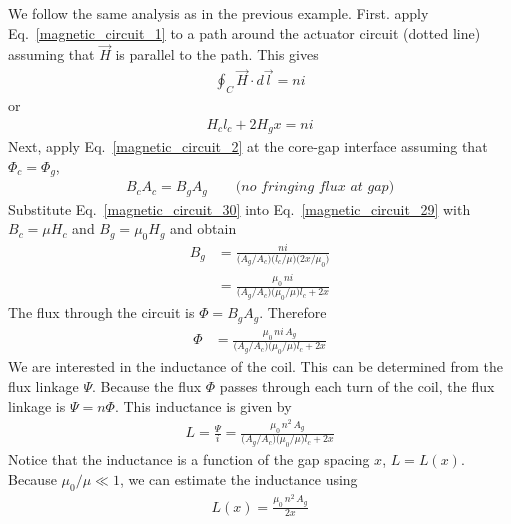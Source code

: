 \documentclass[12pt,a4paper,oneside]{book}
\begin{document}
\begin{onehalfspace}
\begin{example}
	We follow the same analysis as in the previous example.  First. apply Eq.~\eqref{magnetic_circuit_1} to a path around the actuator circuit (dotted line) assuming that $\vec{H}$ is parallel to the path. This gives
	\begin{equation*}\label{}
	{\begin{aligned}
			\oint_{C}\vec{H}\cdot d\vec{l}=ni
	\end{aligned}}
	\end{equation*}
or
	\begin{equation}\label{magnetic_circuit_29}
		{\begin{aligned}
			H_cl_c+2H_gx=ni
		\end{aligned}}
	\end{equation}
Next, apply Eq.~\eqref{magnetic_circuit_2} at the core-gap interface assuming that $\Phi_c=\Phi_g$,
	\begin{equation}\label{magnetic_circuit_30}
	{\begin{aligned}
			B_cA_c=B_gA_g\qquad\textit{(no fringing flux at gap)}
	\end{aligned}}
	\end{equation}
Substitute Eq.~\eqref{magnetic_circuit_30} into Eq.~\eqref{magnetic_circuit_29} with $B_c=\mu H_c$ and $B_g=\mu_0 H_g$ and obtain
\begin{equation*}\label{}
{\begin{aligned}
		B_g &=\frac{ni}{\Big(A_g/A_c\Big)\Big(l_c/\mu\Big)\Big(2x/\mu_0\Big)} \\[6pt]
		&=\frac{\mu_0\,ni}{\Big(A_g/A_c\Big)\Big(\mu_0/\mu\Big)l_c+2x}
\end{aligned}}
\end{equation*}
The flux through the circuit is $\Phi=B_g A_g$. Therefore
\begin{equation*}\label{}
	{\begin{aligned}
			\Phi &=\frac{\mu_0\,ni\,A_g}{\Big(A_g/A_c\Big)\Big(\mu_0/\mu\Big)l_c+2x}
	\end{aligned}}
\end{equation*}
We are interested in the inductance of the coil. This can be determined from the flux linkage $\Psi$. Because the flux $\Phi$ passes through each turn of the coil, the flux linkage is $\Psi=n\Phi$. This inductance is given by
\begin{equation*}\label{}
	{\begin{aligned}
			L=\frac{\Psi}{i}=\frac{\mu_0\,n^2\,A_g}{\Big(A_g/A_c\Big)\Big(\mu_0/\mu\Big)l_c+2x}
	\end{aligned}}
\end{equation*}
Notice that the inductance is a function of the gap spacing $x$, $L=L(x)$. Because $\mu_0/\mu\ll1$, we can estimate the inductance using
 \begin{equation*}\label{}
 	{\begin{aligned}
 			L(x)=\frac{\mu_0\,n^2\,A_g}{2x}
 	\end{aligned}}
 \end{equation*}
\end{example}


\end{onehalfspace}
\end{document}
